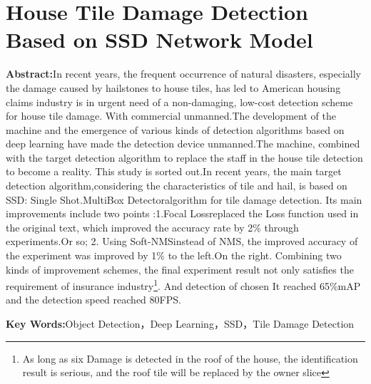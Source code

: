 \section*{House Tile Damage Detection Based on SSD Network Model}
\par \noindent
\textbf{\songti {}Abstract:}In recent years, the frequent occurrence of natural disasters, especially the damage caused by hailstones to house tiles, has led to American housing claims industry is in urgent need of a non-damaging, low-cost detection scheme for house tile damage. With commercial unmanned.The development of the machine and the emergence of various kinds of detection algorithms based on deep learning have made the detection device unmanned.The machine, combined with the target detection algorithm to replace the staff in the house tile detection to become a reality. This study is sorted out.In recent years, the main target detection algorithm,considering the characteristics of tile and hail, is based on SSD: Single Shot.MultiBox Detectoralgorithm for tile damage detection. Its main improvements include two points :1.Focal Lossreplaced the Loss function used in the original text, which improved the accuracy rate by 2\% through experiments.Or so; 2. Using Soft-NMSinstead of NMS, the improved accuracy of the experiment was improved by 1\% to the left.On the right. Combining two kinds of improvement schemes, the final experiment result not only satisfies the requirement of insurance industry\footnote{As long as six Damage is detected in the roof of the house, the identification result is serious, and the roof tile will be replaced by the owner slice}. And detection of chosen It reached 65\%mAP and the detection speed reached 80FPS.~\\

\par \noindent
\textbf{\songti {}Key Words:}{\kaishu {}Object Detection，Deep Learning，SSD，Tile Damage Detection}
